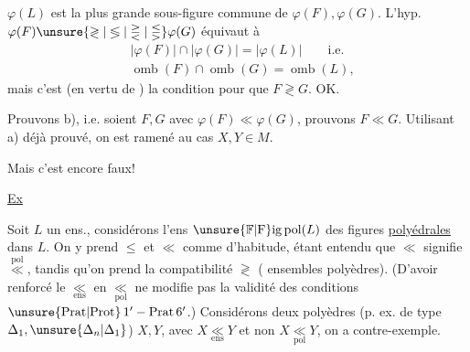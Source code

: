
$\varphi(L)$ est la plus grande sous-figure commune de $\varphi(F),\varphi(G)$. L'hyp. $\varphi(F)\unsure{\gtrless|\lessgtr|\gtreqless|\lesseqgtr}\varphi(G)$ équivaut à
\[
\begin{aligned}
&|\varphi(F)|\cap|\varphi(G)|=|\varphi(L)|\qquad\text{i.e.}\\
&\operatorname{omb}(F)\cap\operatorname{omb}(G)=\operatorname{omb}(L),
\end{aligned}
\]
mais c'est (en vertu de ) la condition pour que $F\gtrless G$. OK.

Prouvons b), i.e. soient $F,G$ avec $\varphi(F)\ll\varphi(G)$, prouvons $F\ll G$.  Utilisant a) déjà prouvé, on est ramené au cas $X,Y\in M$.

Mais c'est encore faux!

\uline{Ex} 

Soit $L$ un ens., considérons l'ens $\unsure{\mathbb{F}|\mathrm{F}}\mathrm{ig}\,\mathrm{pol}(L)$ des figures \uline{polyédrales} dans $L$. On y prend $\leq$ et $\ll$ comme d'habitude, étant entendu que $\ll$ signifie $\overset{\mathrm{pol}}{\ll}$, tandis qu'on prend la compatibilité $\gtrless$ \uline{} (  ensembles  polyèdres). (D'avoir renforcé le $\underset{\mathrm{ens}}{\ll}$ en $\underset{\mathrm{pol}}{\ll}$ ne modifie pas la validité des conditions $\unsure{\mathrm{Prat}|\mathrm{Prot}}\,1'-\mathrm{Prat}\,6'$.) Considérons deux  polyèdres (p. ex. de  type $\Delta_1,\unsure{\Delta_n|\Delta_1}$) $X,Y$, avec $X\underset{\mathrm{ens}}{\ll}Y$ et non $X\underset{\mathrm{pol}}{\ll}Y$, on a  contre-exemple.
